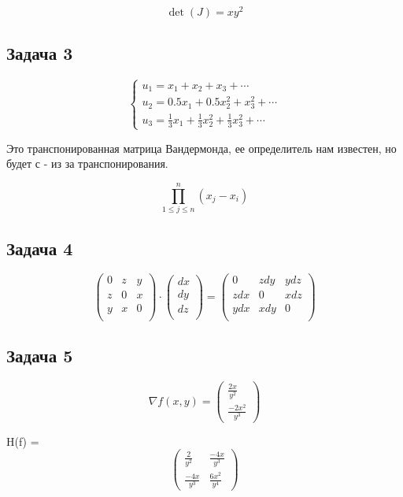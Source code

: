 \documentclass[a4paper,12pt]{article}
\begin{document}
\[
\det(J) = xy^2
\]

\subsection{Задача 3}
\[
\begin{cases}
    u_1 = x_1 + x_2 + x_3 + \cdots  \\
    u_2 = 0.5x_1 + 0.5 x_2^2 + x_3^2 + \cdots \\
    u_3 = \frac{1}{3}x_1 + \frac{1}{3}x_2^2 + \frac{1}{3}x_3^2 + \cdots
\end{cases}
\]

Это транспонированная матрица Вандермонда, ее определитель нам известен, но будет с - из за транспонирования.

\[
\prod_{1\le j \le n}^{n} (x_j - x_i)
\]

\subsection{Задача 4}
\[
\begin{pmatrix}
    0 & z & y \\
    z & 0 & x \\
    y & x & 0 \\
\end{pmatrix} \cdot \begin{pmatrix}
    dx \\
    dy \\
    dz \\
\end{pmatrix} = 
\begin{pmatrix}
    0 & zdy & ydz \\
    zdx & 0 & xdz \\
    ydx & xdy &  0 \\
\end{pmatrix}
\]

\subsection{Задача 5}
\[
\nabla f(x, y) = 
\begin{pmatrix}
    \frac{2x}{y^2} \\
    \frac{-2x^2}{y^3}
\end{pmatrix}
\]

H(f) = 
\[
\begin{pmatrix}
    \frac{2}{y^2} & \frac{-4x}{y^3} \\
    \frac{-4x}{y^3} & \frac{6x^2}{y^4}
\end{pmatrix}
\]
\end{document}
